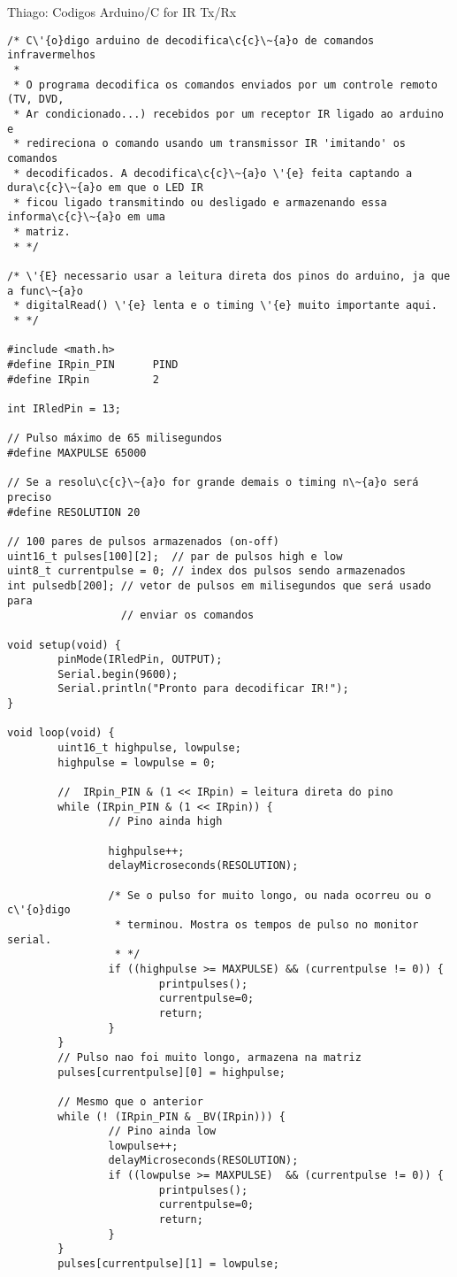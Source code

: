 \begin{section}{Thiago: Codigos Arduino/C for IR Tx/Rx}
\begin{lstlisting}
/* C\'{o}digo arduino de decodifica\c{c}\~{a}o de comandos infravermelhos
 *
 * O programa decodifica os comandos enviados por um controle remoto (TV, DVD,
 * Ar condicionado...) recebidos por um receptor IR ligado ao arduino e 
 * redireciona o comando usando um transmissor IR 'imitando' os comandos 
 * decodificados. A decodifica\c{c}\~{a}o \'{e} feita captando a dura\c{c}\~{a}o em que o LED IR
 * ficou ligado transmitindo ou desligado e armazenando essa informa\c{c}\~{a}o em uma
 * matriz.
 * */

/* \'{E} necessario usar a leitura direta dos pinos do arduino, ja que a func\~{a}o
 * digitalRead() \'{e} lenta e o timing \'{e} muito importante aqui.
 * */

#include <math.h>
#define IRpin_PIN      PIND
#define IRpin          2

int IRledPin = 13;

// Pulso máximo de 65 milisegundos
#define MAXPULSE 65000

// Se a resolu\c{c}\~{a}o for grande demais o timing n\~{a}o será preciso
#define RESOLUTION 20 

// 100 pares de pulsos armazenados (on-off)
uint16_t pulses[100][2];  // par de pulsos high e low 
uint8_t currentpulse = 0; // index dos pulsos sendo armazenados
int pulsedb[200]; // vetor de pulsos em milisegundos que será usado para 
				  // enviar os comandos

void setup(void) {
		pinMode(IRledPin, OUTPUT);
		Serial.begin(9600);
		Serial.println("Pronto para decodificar IR!");
}

void loop(void) {
		uint16_t highpulse, lowpulse;  
		highpulse = lowpulse = 0; 

		//  IRpin_PIN & (1 << IRpin) = leitura direta do pino 
		while (IRpin_PIN & (1 << IRpin)) {
				// Pino ainda high

				highpulse++;
				delayMicroseconds(RESOLUTION);

				/* Se o pulso for muito longo, ou nada ocorreu ou o c\'{o}digo
				 * terminou. Mostra os tempos de pulso no monitor serial.
				 * */
				if ((highpulse >= MAXPULSE) && (currentpulse != 0)) {
						printpulses();
						currentpulse=0;
						return;
				}
		}
		// Pulso nao foi muito longo, armazena na matriz
		pulses[currentpulse][0] = highpulse;

		// Mesmo que o anterior
		while (! (IRpin_PIN & _BV(IRpin))) {
				// Pino ainda low
				lowpulse++;
				delayMicroseconds(RESOLUTION);
				if ((lowpulse >= MAXPULSE)  && (currentpulse != 0)) {
						printpulses();
						currentpulse=0;
						return;
				}
		}
		pulses[currentpulse][1] = lowpulse;


\end{lstlisting}
\end{section}
